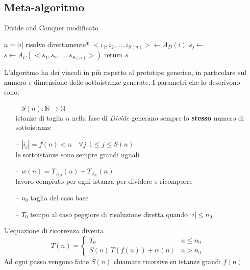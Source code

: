 \subsection{Meta-algoritmo}
\begin{algorithm}[H]
\caption{Divide and Conquer modificato}\label{alg:dncm}
\begin{algorithmic}[1]
        \State $n=|i|$
                                     
            \State *risolvo direttamente*
        \EndIf
        \State $<i_1, i_2, \dots, i_{S(n)}> \gets A_D(i)$    
                            
            \State $s_j \gets $ 
        \EndFor
        \State $s \gets A_C(<s_1, s_2, \dots, s_{S(n)}>)$    
        \State return $s$
    \EndProcedure
\end{algorithmic}
\end{algorithm}
L'algoritmo ha dei vincoli in più rispetto al prototipo generico, in particolare sul numero e dimensione delle sottoistanze generate. I parametri che lo descrivono sono:
\begin{itemize}[noitemsep,topsep=0pt,parsep=0pt,partopsep=0pt]
    \item[--] $S(n): \mathbb{N} \rightarrow \mathbb{N}$ \\
        istanze di taglia $n$ nella fase di \textit{Divide} generano sempre lo \textbf{stesso} numero di sottoistanze
    \item[--] $ |i_j| = f(n) < n \quad \forall j : 1 \leq j \leq S(n) $ \\
        le sottoistanze sono sempre grandi uguali
    \item[--] $ w(n) = T_{A_D}(n) + T_{A_C}(n)$ \\
        lavoro compiuto per ogni istanza per dividere e ricomporre
    \item[--] $n_0$ taglia del caso base
    \item[--] $T_0$ tempo al caso peggiore di risoluzione diretta quando $|i| \leq n_0$
\end{itemize}
L'equazione di ricorrenza diventa
\[
    T(n) = 
    \begin{cases} 
        T_0      &  n \leq n_0 \\
        S(n) \, T(f(n)) + w(n) & n > n_0
    \end{cases}
\]
Ad ogni passo vengono fatte $S(n)$ chiamate ricorsive su istanze grandi $f(n)$

